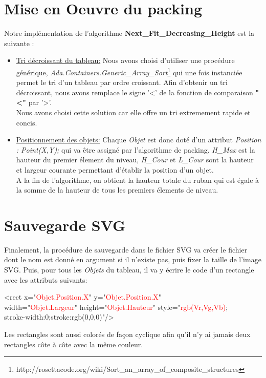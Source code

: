 \documentclass{article}
\begin{document}
\section {Mise en Oeuvre du packing}
Notre implémentation de l'algorithme \textbf{Next\_Fit\_Decreasing\_Height} est la suivante :
\begin{itemize}
  \item \underline{Tri décroissant du tableau:} Nous avons choisi d'utiliser une procédure générique, \textit{Ada.Containers.Generic\_Array\_Sort}\footnote{http://rosettacode.org/wiki/Sort\_an\_array\_of\_composite\_structures} qui une fois instanciée permet le tri d'un tableau par ordre croissant. Afin d'obtenir un tri décroissant, nous avons remplace le signe '<' de la fonction de comparaison \textbf{"<"} par '>'.\\
\noindent Nous avons choisi cette solution car elle offre un tri extremement rapide et concis.
  \item \underline{Positionnement des objets:} Chaque \textit{Objet} est donc doté d'un attribut \emph{Position : Point(X,Y);} qui va être assigné par l'algorithme de packing. \textit{H\_Max} est la hauteur du premier élement du niveau, \textit{H\_Cour} et \textit{L\_Cour} sont la hauteur et largeur courante permettant d'établir la position d'un objet. \\
A la fin de l'algorithme, on obtient la hauteur totale du ruban qui est égale à la somme de la hauteur de tous les premiers élements de niveau.
\end{itemize}

\section {Sauvegarde SVG}
Finalement, la procédure de sauvegarde dans le fichier SVG va créer le fichier dont le nom est donné en argument si il n'existe pas, puis fixer la taille de l'image SVG. Puis, pour tous les \textit{Objets} du tableau, il va y écrire le code d'un rectangle avec les attributs suivants:

\begin{framed}
\small \noindent
<rect x="\textcolor{red}{Objet.Position.X}" y="\textcolor{red}{Objet.Position.X}" \\
width="\textcolor{red}{Objet.Largeur}" height="\textcolor{red}{Objet.Hauteur}" 
        style="\textcolor{red}{rgb(Vr,Vg,Vb)};\\
        stroke-width:0;stroke:rgb(0,0,0)"/>
\end{framed}

Les rectangles sont aussi colorés de façon cyclique afin qu'il n'y ai jamais deux rectangles côte à côte avec la même couleur.
\end{document}
